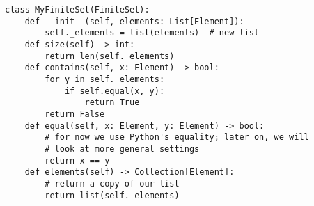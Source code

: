 \par\begin{minipage}{61ex}
\begin{verbatim}
class MyFiniteSet(FiniteSet):
    def __init__(self, elements: List[Element]):
        self._elements = list(elements)  # new list
    def size(self) -> int:
        return len(self._elements)
    def contains(self, x: Element) -> bool:
        for y in self._elements:
            if self.equal(x, y):
                return True
        return False
    def equal(self, x: Element, y: Element) -> bool:
        # for now we use Python's equality; later on, we will
        # look at more general settings
        return x == y
    def elements(self) -> Collection[Element]:
        # return a copy of our list
        return list(self._elements)
\end{verbatim}
\end{minipage}\par